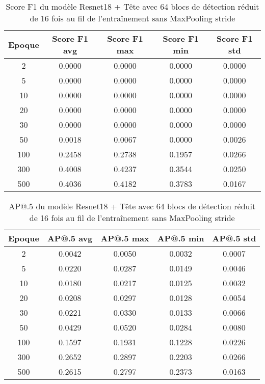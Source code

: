 \begin{table}[!ht]
    \caption{Score F1 du modèle Resnet18 + Tête avec 64 blocs de détection réduit de 16 fois au fil de l'entraînement sans MaxPooling stride}
    \label{tab:resnet18+head_64n_reduced_16x_f1score_wo_maxpool_stride}
    \centering
    \begin{tabular}{ |c||c|c|c|c|  }
        \hline
        \rowcolor{gray!50}
        Epoque & Score F1 avg & Score F1 max & Score F1 min & Score F1 std\\
        \hline
        2 & 0.0000 & 0.0000 & 0.0000 & 0.0000\\
        5 & 0.0000 & 0.0000 & 0.0000 & 0.0000\\
        10 & 0.0000 & 0.0000 & 0.0000 & 0.0000\\
        20 & 0.0000 & 0.0000 & 0.0000 & 0.0000\\
        30 & 0.0000 & 0.0000 & 0.0000 & 0.0000\\
        50 & 0.0018 & 0.0067 & 0.0000 & 0.0026\\
        100 & 0.2458 & 0.2738 & 0.1957 & 0.0266\\
        300 & 0.4008 & 0.4237 & 0.3544 & 0.0250\\
        500 & 0.4036 & 0.4182 & 0.3783 & 0.0167\\
        \hline
    \end{tabular}
\end{table}

\begin{table}[!ht]
    \caption{AP@.5 du modèle Resnet18 + Tête avec 64 blocs de détection réduit de 16 fois au fil de l'entraînement sans MaxPooling stride}
    \label{tab:resnet18+head_64n_reduced_16x_ap50_wo_maxpool_stride}
    \centering
    \begin{tabular}{ |c||c|c|c|c|  }
        \hline
        \rowcolor{gray!50}
        Epoque & AP@.5 avg & AP@.5 max & AP@.5 min & AP@.5 std\\
        \hline
        2 & 0.0042 & 0.0050 & 0.0032 & 0.0007\\
        5 & 0.0220 & 0.0287 & 0.0149 & 0.0046\\
        10 & 0.0180 & 0.0217 & 0.0125 & 0.0032\\
        20 & 0.0208 & 0.0297 & 0.0128 & 0.0054\\
        30 & 0.0221 & 0.0330 & 0.0133 & 0.0066\\
        50 & 0.0429 & 0.0520 & 0.0284 & 0.0080\\
        100 & 0.1597 & 0.1931 & 0.1228 & 0.0226\\
        300 & 0.2652 & 0.2897 & 0.2203 & 0.0266\\
        500 & 0.2615 & 0.2797 & 0.2373 & 0.0163\\
        \hline
    \end{tabular}
\end{table}


